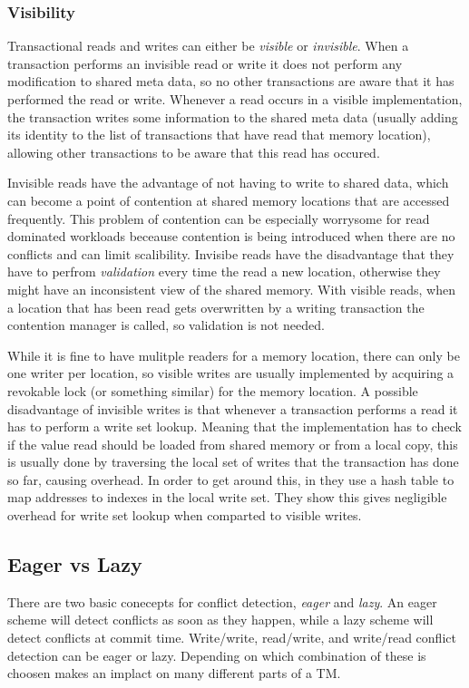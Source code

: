 \subsubsection{Visibility}
Transactional reads and writes can either be \emph{visible} or \emph{invisible}.
When a transaction performs an invisible read or write it does not perform any modification to shared meta data, so no other transactions are aware that it has performed the read or write.
Whenever a read occurs in a visible implementation, the transaction writes some information to the shared meta data (usually adding its identity to the list of transactions that have read that memory location), allowing other transactions to be aware that this read has occured.

Invisible reads have the advantage of not having to write to shared data, which can become a point of contention at shared memory locations that are accessed frequently.
This problem of contention can be especially worrysome for read dominated workloads beceause contention is being introduced when there are no conflicts and can limit scalibility.
Invisibe reads have the disadvantage that they have to perfrom \emph{validation} every time the read a new location, otherwise they might have an inconsistent view of the shared memory.
With visible reads, when a location that has been read gets overwritten by a writing transaction the contention manager is called, so validation is not needed.

While it is fine to have mulitple readers for a memory location, there can only be one writer per location, so visible writes are usually implemented by acquiring a revokable lock (or something similar) for the memory location.
A possible disadvantage of invisible writes is that whenever a transaction performs a read it has to perform a write set lookup.
Meaning that the implementation has to check if the value read should be loaded from shared memory or from a local copy, this is usually done by traversing the local set of writes that the transaction has done so far, causing overhead.
In order to get around this, in \cite{1504199} they use a hash table to map addresses to indexes in the local write set.
They show this gives negligible overhead for write set lookup when comparted to visible writes.

\subsection{Eager vs Lazy}
There are two basic conecepts for conflict detection, \emph{eager} and \emph{lazy}.  An eager scheme will detect conflicts as soon as they happen, while a lazy scheme will detect conflicts at commit time.
Write/write, read/write, and write/read conflict detection can be eager or lazy.  Depending on which combination of these is choosen makes an implact on many different parts of a TM.

